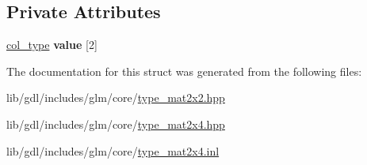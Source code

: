 \subsection*{Private Attributes}
\begin{DoxyCompactItemize}
\item 
\hypertarget{structglm_1_1detail_1_1tmat2x4_ae17f281437889c0b70a85c027a225080}{}\hyperlink{structglm_1_1detail_1_1tvec4}{col\+\_\+type} {\bfseries value} \mbox{[}2\mbox{]}\label{structglm_1_1detail_1_1tmat2x4_ae17f281437889c0b70a85c027a225080}

\end{DoxyCompactItemize}


The documentation for this struct was generated from the following files\+:\begin{DoxyCompactItemize}
\item 
lib/gdl/includes/glm/core/\hyperlink{type__mat2x2_8hpp}{type\+\_\+mat2x2.\+hpp}\item 
lib/gdl/includes/glm/core/\hyperlink{type__mat2x4_8hpp}{type\+\_\+mat2x4.\+hpp}\item 
lib/gdl/includes/glm/core/\hyperlink{type__mat2x4_8inl}{type\+\_\+mat2x4.\+inl}\end{DoxyCompactItemize}
